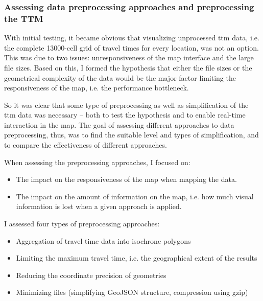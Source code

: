



\subsubsection{Assessing data preprocessing approaches and preprocessing the TTM}

\label{sec:preprocessing}
With initial testing,
it became obvious that
visualizing unprocessed \acrshort{ttm} data,
i.e. the complete 13000-cell grid of travel times for every location,
was not an option. This was due to two issues:
unresponsiveness of the map interface and the large file sizes.
Based on this,
I formed the hypothesis that either the file sizes
or the geometrical complexity of the data would be
the major factor limiting the responsiveness of the map,
i.e. the performance bottleneck.

So it was clear that
some type of preprocessing as well as simplification of the 
\acrshort{ttm} data was necessary --
both to test the hypothesis and to enable real-time interaction in the map.
The goal of assessing different approaches to data preprocessing, thus,
was to find the suitable level and types of simplification,
and to compare the effectiveness of different approaches.

When assessing the preprocessing approaches, I focused on:
\begin{itemize}
	\item The impact on the responsiveness of the map when mapping the data.
	\item The impact on the amount of information on the map,
	i.e. how much visual information is lost when a given approach is applied.
\end{itemize}

I assessed four types of preprocessing approaches:
\begin{itemize}
	\item Aggregation of travel time data into isochrone polygons 
	\item Limiting the maximum travel time, i.e. the geographical extent of the results 
	\item Reducing the coordinate precision of geometries
	\item Minimizing files (simplifying GeoJSON structure, compression using gzip)
\end{itemize}


